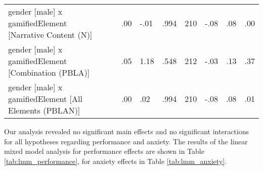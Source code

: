 \begin{table}[h]
{\begin{tabular}{|l|l|l|l|l|l|l|l|l|l|}
            \makecell{gender [male] x \\ gamifiedElement [Narrative Content (N)]} &  &  & .00 & -.01 & .994 & 210 & -.08 & .08 & .00 \\
            \makecell{gender [male] x \\ gamifiedElement [Combination (PBLA)]} &  &  & .05 & 1.18 & .548 & 212 & -.03 & .13 & .37 \\
            \makecell{gender [male] x \\ gamifiedElement [All Elements (PBLAN)]} &  &  & .00 & .02 & .994 & 210 & -.08 & .08 & .01 \\
            \hline
        \end{tabular}
    }
\end{table}

Our analysis revealed no significant main effects and no significant interactions for all hypotheses regarding performance and anxiety.
The results of the linear mixed model analysis for performance effects are shown in Table \ref{tab:lmm_performance}, for anxiety effects in Table \ref{tab:lmm_anxiety}.